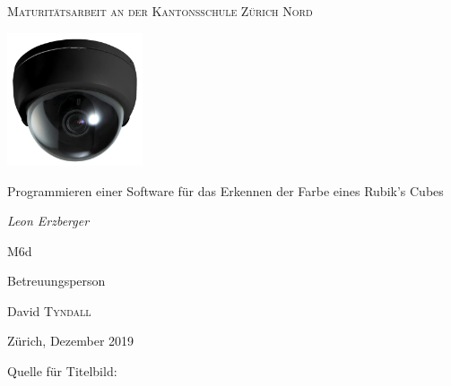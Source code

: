 \documentclass[a4paper, 12pt]{article}
\begin{document}
\begin{titlepage}
	\centering
	{\scshape\Large Maturitätsarbeit an der Kantonsschule Zürich Nord \par}
	\vspace{1cm}
	\includegraphics[width=0.3\textwidth]{Ueberwachungskamera}\par\vspace{1cm}
	\vspace{1cm}
	{\LARGE Programmieren einer Software für das Erkennen der Farbe eines Rubik's Cubes\par}
	\vspace{2cm}	
	{\Large\itshape Leon Erzberger\par}
	
	{\large M6d\par}
	\vfill
	Betreuungsperson\par
	David \textsc{Tyndall}

	\vfill

	{\large Zürich, Dezember 2019\par}
\end{titlepage}
\newpage
Quelle für Titelbild: \cite{Ueberwachung_Bild}
\newpage
{}

\begin{abstract}%
\noindent
Ziel dieser Maturaarbeit war, ein möglichst gutes Programm für die Farberkennung eines Rubik's Cubes zu programmieren. Dafür wurden die beiden Farbräume RGB und HSV miteinander verglichen. Ausserdem wurde eine spezielle Methode für das Erkennen von schwarzen und weissen Feldern ausprobiert. Zum Schluss wurden dann noch zwei Methoden verglichen, die Korrekturen vornahmen, so dass jede Farbe exakt 9 mal vorkommt. Das ausschliessliche Verwenden von Hue zur Unterscheidung der Farben, das Benützen von der Methode, um weiss und schwarz loszuwerden, und das Verwenden einer der zwei Korrekturmethoden lieferte die besten Ergebnisse, mit durchschnittlich 8.5 Fehlern bei 54 Feldern.
\end{abstract}
\tableofcontents
\clearpage
\newpage\null\thispagestyle{empty}\newpage
{} 
\newpage
\end{document}
